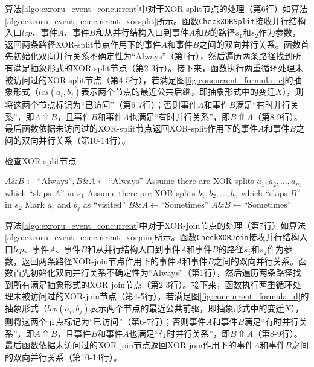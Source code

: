 算法\ref{algo:exroru_event_concurrent}中对于XOR-split节点的处理（第6行）如算法\ref{algo:exroru_event_concurrent_xorsplit}所示。函数\texttt{CheckXORSplit}接收并行结构入口$lcp$、事件$A$、事件$B$和从并行结构入口到事件$A$和$B$的路径$s_{1}$和$s_{2}$作为参数，返回两条路径XOR-split节点作用下的事件$A$和事件$B$之间的双向并行关系。函数首先初始化双向并行关系不确定性为“Always”（第1行），然后遍历两条路径找到所有满足抽象形式的XOR-split节点（第2-3行）。接下来，函数执行两重循环处理未被访问过的XOR-split节点（第4-5行），若满足图\ref{fig:concurrent_formula_c}的抽象形式（$lcs(a_{i},b_{j})$表示两个节点的最近公共后继，即抽象形式中的变迁$X$），则将这两个节点标记为“已访问”（第6-7行）；否则事件$A$和事件$B$满足“有时并行关系”，即$A\Uparrow B$，且事件$B$和事件$A$也满足“有时并行关系”，即$B\Uparrow A$（第8-9行）。最后函数依据未访问过的XOR-split节点返回XOR-split作用下的事件$A$和事件$B$之间的双向并行关系（第10-14行）。

\begin{algorithm}[htbp]
  \LinesNumbered
  \caption{检查XOR-split节点}
  \label{algo:exroru_event_concurrent_xorsplit}
   {
  	\nl $A\&B\leftarrow\text{``Always''},B\&A\leftarrow\text{``Always''}$\;
  	\nl Assume there are XOR-splits $a_{1},a_{2},...,a_{m}$ which ``skips $A$'' in $s_{1}$\;
  	\nl Assume there are XOR-splits $b_{1},b_{2},...,b_{n}$ which ``skips $B$'' in $s_{2}$\;
  	\nl {} {
  	  \nl {} {
  	    \nl {} {
  	      \nl Mark $a_{i}$ and $b_{j}$ as ``visited''\;
  	    } \nl {}
  	  }
  	}
  	\nl {} {
  	  \nl $B\&A\leftarrow\text{``Sometimes''}$\;
  	}
  	\nl {} {
  	  \nl $A\&B\leftarrow\text{``Sometimes''}$\;
  	}
  	\nl {}
  }
\end{algorithm}

算法\ref{algo:exroru_event_concurrent}中对于XOR-join节点的处理（第7行）如算法\ref{algo:exroru_event_concurrent_xorjoin}所示。函数\texttt{CheckXORJoin}接收并行结构入口$lcp$、事件$A$、事件$B$和从并行结构入口到事件$A$和事件$B$的路径$s_{1}$和$s_{2}$作为参数，返回两条路径XOR-join节点作用下的事件$A$和事件$B$之间的双向并行关系。函数首先初始化双向并行关系不确定性为“Always”（第1行），然后遍历两条路径找到所有满足抽象形式的XOR-join节点（第2-3行）。接下来，函数执行两重循环处理未被访问过的XOR-join节点（第4-5行），若满足图\ref{fig:concurrent_formula_d}的抽象形式（$lcp(a_{i},b_{j})$表示两个节点的最近公共前驱，即抽象形式中的变迁$X$），则将这两个节点标记为“已访问”（第6-7行）；否则事件$A$和事件$B$满足“有时并行关系”，即$A\Uparrow B$，且事件$B$和事件$A$也满足“有时并行关系”，即$B\Uparrow A$（第8-9行）。最后函数依据未访问过的XOR-join节点返回XOR-join作用下的事件$A$和事件$B$之间的双向并行关系（第10-14行）。

